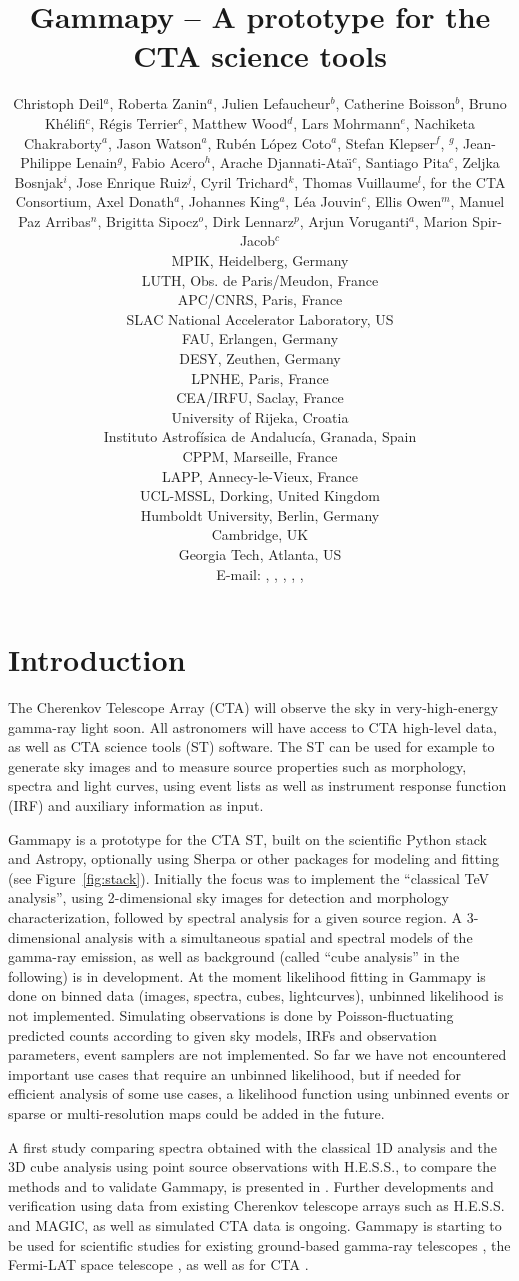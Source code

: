 \documentclass{PoS}
\title{Gammapy -- A prototype for the CTA science tools}
\author{
Christoph Deil$^a$,
Roberta Zanin$^a$,
Julien Lefaucheur$^b$,
Catherine Boisson$^b$,
Bruno Kh\'elifi$^c$,
R\'egis Terrier$^c$,
Matthew Wood$^d$,
Lars Mohrmann$^e$,
Nachiketa Chakraborty$^a$,
Jason Watson$^a$,
Rub\'en L\'opez Coto$^a$,
Stefan Klepser$^f$,
\speaker{Matteo Cerruti}$^g$,
Jean-Philippe Lenain$^g$,
Fabio Acero$^h$,
Arache Djannati-Ata{\"\i}$^c$,
Santiago Pita$^c$,
Zeljka Bosnjak$^i$,
Jose Enrique Ruiz$^j$,
Cyril Trichard$^k$,
Thomas Vuillaume$^l$,
for the CTA Consortium,
Axel Donath$^a$,
Johannes King$^a$,
L\'ea Jouvin$^c$,
Ellis Owen$^m$,
Manuel Paz Arribas$^n$,
Brigitta Sipocz$^o$,
Dirk Lennarz$^p$,
Arjun Voruganti$^a$,
Marion Spir-Jacob$^c$
\\
\llap{$^a$}MPIK, Heidelberg, Germany\\
\llap{$^b$}LUTH, Obs. de Paris/Meudon, France\\
\llap{$^c$}APC/CNRS, Paris, France\\
\llap{$^d$}SLAC National Accelerator Laboratory, US\\
\llap{$^e$}FAU, Erlangen, Germany\\
\llap{$^f$}DESY, Zeuthen, Germany\\
\llap{$^g$}LPNHE, Paris, France\\
\llap{$^h$}CEA/IRFU, Saclay, France\\
\llap{$^i$}University of Rijeka, Croatia\\
\llap{$^j$}Instituto Astrof\'isica de Andaluc\'ia, Granada, Spain\\
\llap{$^k$}CPPM, Marseille, France\\
\llap{$^l$}LAPP, Annecy-le-Vieux, France\\
\llap{$^m$}UCL-MSSL, Dorking, United Kingdom\\
\llap{$^n$}Humboldt University, Berlin, Germany\\
\llap{$^o$}Cambridge, UK\\
\llap{$^p$}Georgia Tech, Atlanta, US\\
E-mail:
\email{Christoph.Deil@mpi-hd.mpg.de},
\email{Roberta.Zanin@mpi-hd.mpg.de},
\email{julien.lefaucheur@obspm.fr},
\email{catherine.boisson@obspm.fr},
\email{khelifi@apc.in2p3.fr},
}
\begin{document}
\section{Introduction}
\label{sec:intro}

The Cherenkov Telescope Array (CTA) will observe the sky in very-high-energy
gamma-ray light soon. All astronomers will have access to CTA high-level data,
as well as CTA science tools (ST) software. The ST can be used for example to
generate sky images and to measure source properties such as morphology, spectra
and light curves, using event lists as well as instrument response function
(IRF) and auxiliary information as input.

Gammapy is a prototype for the CTA ST, built on the scientific Python stack and
Astropy, optionally using Sherpa or other packages for modeling and fitting (see
Figure~\ref{fig:stack}). Initially the focus was to implement the ``classical
TeV analysis'', using 2-dimensional sky images for detection and morphology
characterization, followed by spectral analysis for a given source region. A
3-dimensional analysis with a simultaneous spatial and spectral models of the
gamma-ray emission, as well as background (called ``cube analysis'' in the
following) is in development. At the moment likelihood fitting in Gammapy is
done on binned data (images, spectra, cubes, lightcurves), unbinned likelihood
is not implemented. Simulating observations is done by Poisson-fluctuating
predicted counts according to given sky models, IRFs and observation parameters,
event samplers are not implemented. So far we have not encountered important use
cases that require an unbinned likelihood, but if needed for efficient analysis
of some use cases, a likelihood function using unbinned events or sparse or
multi-resolution maps could be added in the future.

A first study comparing spectra obtained with the classical 1D analysis and the
3D cube analysis using point source observations with H.E.S.S., to compare the
methods and to validate Gammapy, is presented in \cite{lea}. Further
developments and verification using data from existing Cherenkov telescope
arrays such as H.E.S.S. and MAGIC, as well as simulated CTA data is ongoing.
Gammapy is starting to be used for scientific studies for existing ground-based
gamma-ray telescopes \cite{hgps, shells}, the Fermi-LAT space telescope
\cite{owen2015}, as well as for CTA \cite{julien, roberta, cyril}.
\end{document}
